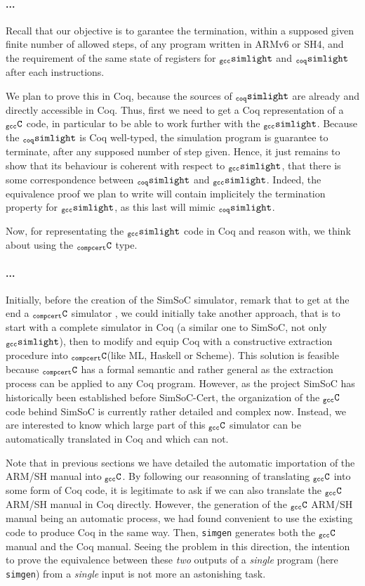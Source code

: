 \documentclass[a4paper, 11pt]{article}
\newcommand{\gccSL}{$_{\tt gcc}{\tt simlight}$\xspace}
\newcommand{\SL}{$_{\tt coq}{\tt simlight}$\xspace}
\newcommand{\simgen}{{\tt simgen}\xspace}
\newcommand{\C}{$_{\tt compcert}{\tt C}$\xspace}
\newcommand{\gccC}{$_{\tt gcc}{\tt C}$\xspace}
\begin{document}
\paragraph{...}
Recall that our objective is to garantee the termination, within a supposed given finite number of allowed steps, of any program written in ARMv6 or SH4, and the requirement of the same state of registers for \gccSL and \SL after each instructions. 

We plan to prove this in Coq, because the sources of \SL are already and directly accessible in Coq. Thus, first we need to get a Coq representation of a \gccC code, in particular to be able to work further with the \gccSL. 
Because the \SL is Coq well-typed, the simulation program is guarantee to terminate, after any supposed number of step given. Hence, it just remains to show that its behaviour is coherent with respect to \gccSL, that there is some correspondence between \SL and \gccSL. Indeed, the equivalence proof we plan to write will contain implicitely the termination property for \gccSL, as this last will mimic \SL. 

Now, for representating the \gccSL code in Coq and reason with, we think about using the \C type.
\paragraph{...}
Initially, before the creation of the SimSoC simulator, remark that to get at the end a %
\C simulator%
, we could initially take another approach, that is to start with a complete simulator in Coq (a similar one to SimSoC, not only \gccSL), then to modify and equip Coq with a constructive extraction procedure into \C (like ML, Haskell or Scheme). This solution is feasible because \C has a formal semantic and rather general as the extraction process can be applied to any Coq program. However, as the project SimSoC has historically been established before SimSoC-Cert, the organization of the \gccC code behind SimSoC is currently rather detailed and complex now. Instead, we are interested to know which large part of this \gccC simulator can be automatically translated in Coq and which can not.

Note that in previous sections we have detailed the automatic importation of the ARM/SH manual into \gccC. By following our reasonning of translating \gccC into some form of Coq code, it is legitimate to ask if we can also translate the \gccC ARM/SH manual in Coq directly. However, the generation of the \gccC ARM/SH manual being an automatic process, we had found convenient to use the existing code to produce Coq in the same way. Then, \simgen generates both the \gccC manual and the Coq manual. Seeing the problem in this direction, the intention to prove the equivalence between these \emph{two} outputs of a \emph{single} program (here \simgen) from a \emph{single} input is not more an astonishing task.
\end{document}
